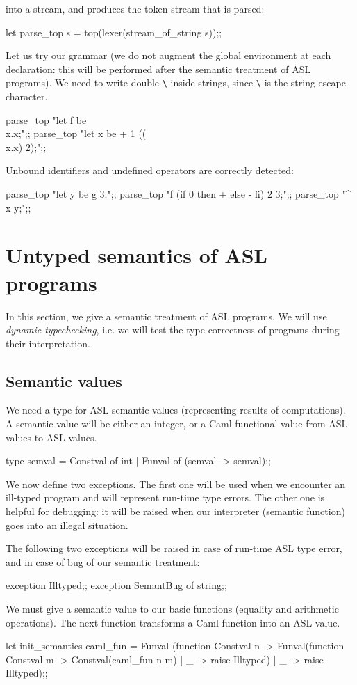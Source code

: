 into a stream, and produces the token stream that is parsed:
\begin{caml_example}
let parse_top s = top(lexer(stream_of_string s));;
\end{caml_example}
Let us try our grammar (we do not augment the global environment at
each declaration: this will be performed after the semantic treatment
of ASL programs). We need to write double \verb|\| inside strings,
since \verb|\| is the string escape character.
\begin{caml_example}
parse_top "let f be \\x.x;";;
parse_top "let x be + 1 ((\\x.x) 2);";;
\end{caml_example}
Unbound identifiers and undefined operators are correctly detected:
\begin{caml_example}
parse_top "let y be g 3;";;
parse_top "f (if 0 then + else - fi) 2 3;";;
parse_top "^ x y;";;
\end{caml_example}

\chapter{Untyped semantics of ASL programs}
\label{c:ASLsemantics}


In this section, we give a semantic treatment of ASL programs. We will use
{\em dynamic typechecking}, i.e. we will test the type correctness of
programs during their interpretation.

\section{Semantic values}
%

We need a type for ASL semantic values (representing results of computations).
A semantic value will be either an integer, or a Caml functional value
from ASL values to ASL values.
\begin{caml_example}
type semval = Constval of int
            | Funval of (semval -> semval);;
\end{caml_example}
We now define two exceptions. The first one will be used when we
encounter an ill-typed program and will represent run-time type
errors. The other one is helpful  for debugging: it will be raised when
our interpreter (semantic function) goes into an illegal situation.


The following two exceptions will be raised in case of run-time
ASL type error, and in case of bug of our semantic treatment:
\begin{caml_example}
exception Illtyped;;
exception SemantBug of string;;
\end{caml_example}
We must give a semantic value to our basic functions (equality and
arithmetic operations). The next function transforms a Caml function
into an ASL value.
%
\begin{caml_example}
let init_semantics caml_fun =
    Funval
      (function Constval n ->
         Funval(function Constval m -> Constval(caml_fun n m)
                        | _ -> raise Illtyped)
              | _ -> raise Illtyped);;
\end{caml_example}



